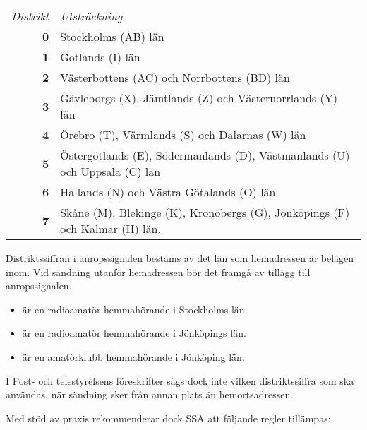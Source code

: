 \begin{center}
\begin{tabular}{rp{6cm}}
\emph{Distrikt} & \emph{Utsträckning} \\
\textbf{0} & Stockholms (AB) län \\
\textbf{1} & Gotlands (I) län \\
\textbf{2} & Västerbottens (AC) och Norrbottens (BD) län \\
\textbf{3} & Gävleborgs (X), Jämtlands (Z) och Västernorrlands (Y) län \\
\textbf{4} & Örebro (T), Värmlands (S) och Dalarnas (W) län \\
\textbf{5} & Östergötlands (E), Södermanlands (D), Västmanlands (U) och Uppsala (C) län\\
\textbf{6} & Hallands (N) och Västra Götalands (O) län \\
\textbf{7} & Skåne (M), Blekinge (K), Kronobergs (G), Jönköpings (F) och Kalmar (H) län.\\
\end{tabular}
\end{center}

Distriktssiffran i anropssignalen bestäms av det län som hemadressen är belägen inom.
Vid sändning utanför hemadressen bör det framgå av tillägg till anropssignalen.

\begin{tcolorbox}[title=Exempel]
	\begin{itemize}
		\item {} är en radioamatör hemmahörande i Stockholms län.
		\item {} är en radioamatör hemmahörande i Jönköpings län.
		\item {} är en amatörklubb hemmahörande i Jönköping län.
	\end{itemize}
\end{tcolorbox}
\medskip

I Post- och telestyrelsens föreskrifter sägs dock inte vilken distriktssiffra
som ska användas, när sändning sker från annan plats än hemortsadressen.

Med stöd av praxis rekommenderar dock SSA att följande regler tillämpas:

